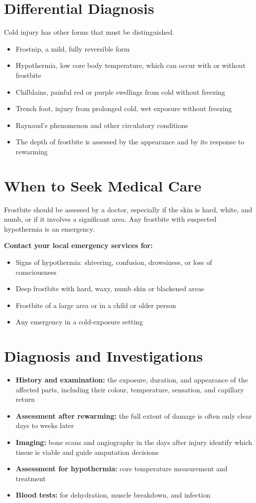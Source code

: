 \section*{Differential Diagnosis}
Cold injury has other forms that must be distinguished.
\begin{itemize}
    \item Frostnip, a mild, fully reversible form
    \item Hypothermia, low core body temperature, which can occur with or without frostbite
    \item Chilblains, painful red or purple swellings from cold without freezing
    \item Trench foot, injury from prolonged cold, wet exposure without freezing
    \item Raynaud's phenomenon and other circulatory conditions
    \item The depth of frostbite is assessed by the appearance and by its response to rewarming
\end{itemize}

\section*{When to Seek Medical Care}
Frostbite should be assessed by a doctor, especially if the skin is hard, white, and numb, or if it involves a significant area. Any frostbite with suspected hypothermia is an emergency.

\textbf{Contact your local emergency services for:}
\begin{itemize}
    \item Signs of hypothermia: shivering, confusion, drowsiness, or loss of consciousness
    \item Deep frostbite with hard, waxy, numb skin or blackened areas
    \item Frostbite of a large area or in a child or older person
    \item Any emergency in a cold-exposure setting
\end{itemize}

\section*{Diagnosis and Investigations}
\begin{itemize}
    \item \textbf{History and examination:} the exposure, duration, and appearance of the affected parts, including their colour, temperature, sensation, and capillary return
    \item \textbf{Assessment after rewarming:} the full extent of damage is often only clear days to weeks later
    \item \textbf{Imaging:} bone scans and angiography in the days after injury identify which tissue is viable and guide amputation decisions
    \item \textbf{Assessment for hypothermia:} core temperature measurement and treatment
    \item \textbf{Blood tests:} for dehydration, muscle breakdown, and infection
\end{itemize}

